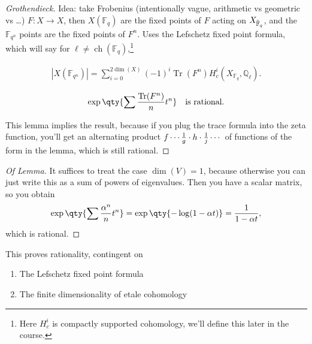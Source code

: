 \begin{proof}[Grothendieck]

Idea: take Frobenius (intentionally vague, arithmetic vs geometric vs
\ldots) \(F:X\to X\), then \(X({\mathbb{F}}_q)\) are the fixed points of
\(F\) acting on
\(X_{\mkern 1.5mu\overline{\mkern-1.5mu{\mathbb{F}}\mkern-1.5mu}\mkern 1.5mu_q}\),
and the \({\mathbb{F}}_{q^n}\) points are the fixed points of \(F^n\).
Uses the Lefschetz fixed point formula, which will say for
\(\ell\neq \operatorname{ch}({\mathbb{F}}_q)\),\footnote{Here \(H^i_c\)
  is compactly supported cohomology, we'll define this later in the
  course.}

\begin{align*}  
{\left\lvert {X({\mathbb{F}}_{q^n})} \right\rvert} = \sum_{i=0}^{2\dim(X)} (-1)^i \operatorname{Tr}(F^n) H^i_c(X_{{\mathbb{F}}_q}, {\mathbb{Q}}_\ell)
.\end{align*}

\begin{lemma}

\begin{align*}  
\exp\qty{\sum {\operatorname{Tr}(F^n) \over n}t^n  }\quad\text{is rational}
.\end{align*}

\end{lemma}

This lemma implies the result, because if you plug the trace formula
into the zeta function, you'll get an alternating product
\(f \cdots {1\over g} \cdot h \cdot {1\over j} \cdots\) of functions of
the form in the lemma, which is still rational.

\end{proof}

\begin{proof}[Of Lemma]

It suffices to treat the case \(\dim(V) = 1\), because otherwise you can
just write this as a sum of powers of eigenvalues. Then you have a
scalar matrix, so you obtain
\begin{align*}  
\exp\qty{ \sum {\alpha^n \over n} t^n} = \exp\qty{ -\log(1 - \alpha t)} = {1 \over 1-\alpha t}
,\end{align*}
which is rational.

\end{proof}

This proves rationality, contingent on

\begin{enumerate}
\def\labelenumi{\arabic{enumi}.}
\tightlist
\item
  The Lefschetz fixed point formula
\item
  The finite dimensionality of etale cohomology
\end{enumerate}

